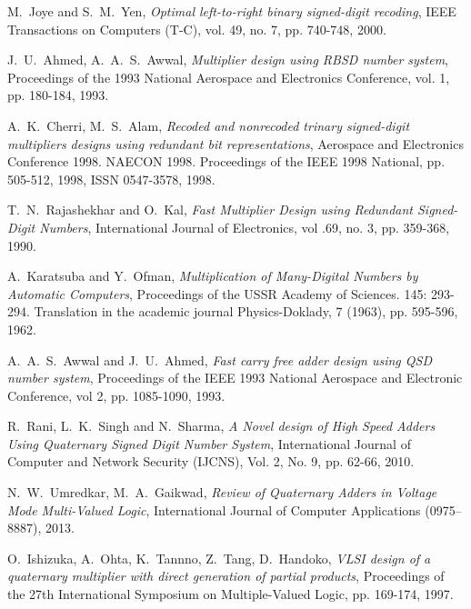 \documentclass[conference]{IEEEtran_IBSS}
\begin{document}
\begin{thebibliography}{1}
M.~Joye and S.~M.~Yen, \emph{Optimal left-to-right binary signed-digit recoding}, IEEE Transactions on Computers (T-C), vol. 49, no. 7, pp. 740-748, 2000.

J.~U.~Ahmed, A.~A.~S.~Awwal, \emph{Multiplier design using RBSD number system}, Proceedings of the 1993 National Aerospace and Electronics Conference, vol. 1, pp. 180-184, 1993.

A.~K.~Cherri, M.~S.~Alam, \emph{Recoded and nonrecoded trinary signed-digit multipliers designs using redundant bit representations}, Aerospace and Electronics Conference 1998. NAECON 1998. Proceedings of the IEEE 1998 National, pp. 505-512, 1998, ISSN 0547-3578, 1998.

T.~N.~Rajashekhar and O.~Kal, \emph{Fast Multiplier Design using Redundant Signed-Digit Numbers}, International Journal of Electronics, vol .69, no. 3, pp. 359-368, 1990.

A.~Karatsuba and Y.~Ofman, \emph{Multiplication of Many-Digital Numbers by Automatic Computers}, Proceedings of the USSR Academy of Sciences. 145: 293-294. Translation in the academic journal Physics-Doklady, 7 (1963), pp. 595-596, 1962.

A.~A.~S.~Awwal and J.~U.~Ahmed, \emph{Fast carry free adder design using QSD number system}, Proceedings of the IEEE 1993 National Aerospace and Electronic Conference, vol 2, pp. 1085-1090, 1993.

R.~Rani, L.~K.~Singh and N.~Sharma, \emph{A Novel design of High Speed Adders Using Quaternary Signed Digit Number System}, International Journal of Computer and Network Security (IJCNS), Vol. 2, No. 9, pp. 62-66, 2010.

N.~W.~Umredkar, M.~A.~Gaikwad, \emph{Review of Quaternary Adders in Voltage Mode  Multi-Valued Logic}, International Journal of Computer Applications (0975–8887), 2013.


O.~Ishizuka, A.~Ohta, K.~Tannno, Z.~Tang, D.~Handoko, \emph{VLSI design of a quaternary multiplier with direct generation of partial products}, Proceedings of the 27th International Symposium on Multiple-Valued Logic, pp. 169-174, 1997.


\end{thebibliography}
\end{document}
